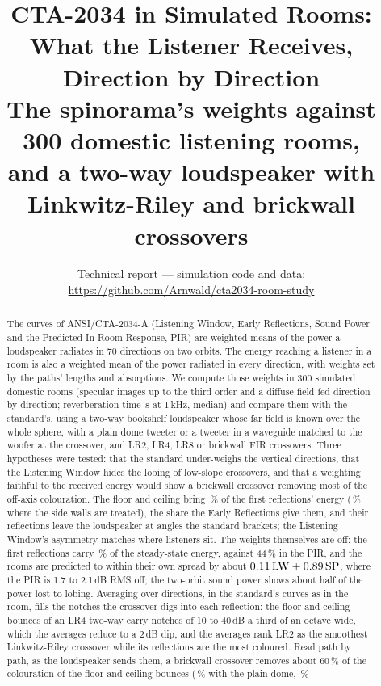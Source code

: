 \documentclass[11pt,a4paper]{article}
\title{CTA-2034 in Simulated Rooms:\\What the Listener Receives, Direction by Direction\\[4pt]
\large The spinorama's weights against 300 domestic listening rooms,\\and a two-way loudspeaker with
Linkwitz-Riley and brickwall crossovers}
\author{}
\date{Technical report --- simulation code and data:\\
\url{https://github.com/Arnwald/cta2034-room-study}}
\begin{document}
\maketitle

\begin{abstract}
The curves of ANSI/CTA-2034-A (Listening Window, Early Reflections, Sound Power and the Predicted
In-Room Response, PIR) are weighted means of the power a loudspeaker radiates in 70 directions on
two orbits. The energy reaching a listener in a room is also a weighted mean of the power radiated
in every direction, with weights set by the paths' lengths and absorptions. We compute those weights
in 300 simulated domestic rooms (specular images up to the third order and a diffuse field fed
direction by direction; reverberation time \nrtMedian\,s at 1\,kHz, median) and compare them with
the standard's, using a two-way bookshelf loudspeaker whose far field is known over the whole
sphere, with a plain dome tweeter or a tweeter in a waveguide matched to the woofer at the
crossover, and LR2, LR4, LR8 or brickwall FIR crossovers. Three hypotheses were tested: that the
standard under-weighs the vertical directions, that the Listening Window hides the lobing of
low-slope crossovers, and that a weighting faithful to the received energy would show a brickwall
crossover removing most of the off-axis colouration. The floor and ceiling bring \nvertShare\,\% of
the first reflections' energy (\nvertTreated\,\% where the side walls are treated), the share the
Early Reflections give them, and their reflections leave the loudspeaker at angles the standard
brackets; the Listening Window's asymmetry matches where listeners sit. The weights themselves are
off: the first reflections carry \nfirstShare\,\% of the steady-state energy, against 44\,\% in the PIR,
and the rooms are predicted to within their own spread by about $0.11\,\mathrm{LW} +
0.89\,\mathrm{SP}$, where the PIR is 1.7 to 2.1\,dB RMS off; the two-orbit sound power shows about half
of the power lost to lobing. Averaging over directions, in the standard's curves as in the room, fills
the notches the crossover digs into each reflection: the floor and ceiling bounces of an LR4 two-way
carry notches of 10 to 40\,dB a third of an octave wide, which the averages reduce to a 2\,dB dip, and
the averages rank LR2 as the smoothest Linkwitz-Riley crossover while its reflections are the most
coloured. Read path by path, as the loudspeaker sends them, a brickwall crossover removes about 60\,\% of
the colouration of the floor and ceiling bounces (\ncolDomeRedVert\,\% with the plain dome, \ncolWgRedVert\,\%

\end{abstract}
\end{document}
